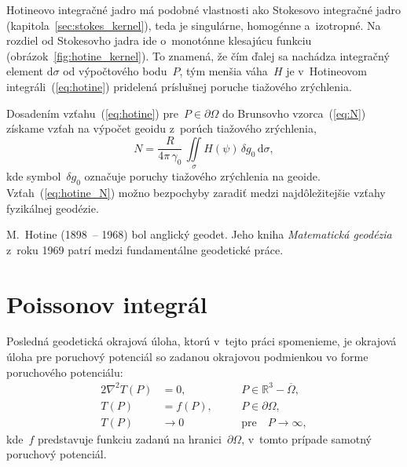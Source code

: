 \documentclass[a4paper, 12pt]{book}
\newcommand{\diff}{\mathrm d}
\begin{document}
Hotineovo integračné jadro má podobné vlastnosti ako Stokesovo integračné jadro 
(kapitola~\ref{sec:stokes_kernel}), teda je singulárne, homogénne a~izotropné.  
Na rozdiel od Stokesovho jadra ide o~monotónne klesajúcu funkciu 
(obrázok~\ref{fig:hotine_kernel}).  To znamená, že čím ďalej sa nachádza 
integračný element $\diff\sigma$ od výpočtového bodu~$P$, tým menšia váha~$H$ 
je v~Hotineovom integráli~(\ref{eq:hotine}) pridelená príslušnej poruche 
tiažového zrýchlenia.

Dosadením vzťahu~(\ref{eq:hotine}) pre~$P \in \partial\Omega$ do Brunsovho 
vzorca~(\ref{eq:N}) získame vzťah na výpočet geoidu z~porúch tiažového 
zrýchlenia,
%
\begin{equation}
\label{eq:hotine_N}
N = \frac{R}{4\pi \, \gamma_0} \, \iint\limits_{\sigma} H(\psi) \, \delta g_0 
\, \diff \sigma{,}
\end{equation}
%
kde symbol~$\delta g_0$ označuje poruchy tiažového zrýchlenia na geoide.  
Vzťah~(\ref{eq:hotine_N}) možno bezpochyby zaradiť medzi najdôležitejšie vzťahy 
fyzikálnej geodézie.

M.~Hotine (1898~-- 1968) bol anglický geodet.  Jeho kniha \textit{Matematická 
geodézia} z~roku 1969 patrí medzi fundamentálne geodetické práce.

\section{Poissonov integrál}
\label{sec:poisson_integral}

Posledná geodetická okrajová úloha, ktorú v~tejto práci spomenieme, je okrajová 
úloha pre poruchový potenciál so zadanou okrajovou podmienkou vo forme 
poruchového potenciálu:
%
\begin{alignat}{2}
\nabla^2 T(P) &= 0{,} &&P \in \mathbb{R}^3 
- \overline\Omega{,}\label{eq:bvp_t_laplace}\\
%
T(P) &= f(P){,} \quad &&P \in 
\partial\Omega{,}\label{eq:bvp_t_boundary_condition}\\
%
T(P) &\rightarrow 0 &&\textrm{pre} \quad P \rightarrow 
\infty{,}\label{eq:bvp_t_t_infty}
\end{alignat}
%
kde~$f$ predstavuje funkciu zadanú na hranici~$\partial\Omega$, v~tomto prípade 
samotný poruchový potenciál.
\end{document}
